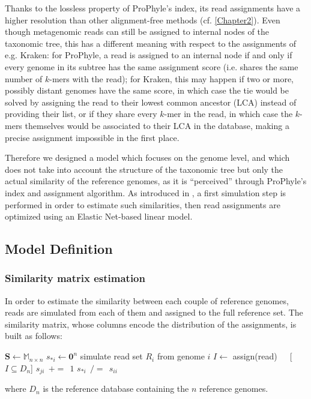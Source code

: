 Thanks to the lossless property of ProPhyle's index, its read assignments have a higher resolution than other alignment-free methods (cf. \ref{Chapter2}). Even though metagenomic reads can still be assigned to internal nodes of the taxonomic tree, this has a different meaning with respect to the assignments of e.g. Kraken: for ProPhyle, a read is assigned to an internal node if and only if every genome in its subtree has the same assignment score (i.e. shares the same number of $k$-mers with the read); for Kraken, this may happen if two or more, possibly distant genomes have the same score, in which case the tie would be solved by assigning the read to their lowest common ancestor (LCA) instead of providing their list, or if they share every $k$-mer in the read, in which case the $k$-mers themselves would be associated to their LCA in the database, making a precise assignment impossible in the first place.

Therefore we designed a model which focuses on the genome level, and which does not take into account the structure of the taxonomic tree but only the actual similarity of the reference genomes, as it is ``perceived'' through ProPhyle's index and assignment algorithm. As introduced in \cite{lindner_metagenomic_2013}, a first simulation step is performed in order to estimate such similarities, then read assignments are optimized using an Elastic Net-based linear model.

\subsection{Model Definition}

\subsubsection{Similarity matrix estimation}
In order to estimate the similarity between each couple of reference genomes, reads are simulated from each of them and assigned to the full reference set. The similarity matrix, whose columns encode the distribution of the assignments, is built as follows:
\newpage
\begin{algorithmic}
\State $\mathbf{S} \gets \mathbb{M}_{n\times n}$
\State $s_{*i} \gets \mathbf{0}^n$
\State simulate read set $R_i$ from genome $i$
\State $I \gets$ assign(read)~~~[$I \subseteq D_n$]
\State $s_{ji}~~{+=}~~1$
\EndFor
\EndFor
$s_{*i}~~{/=}~~s_{ii}$
\EndFor
\end{algorithmic}
where $D_n$ is the reference database containing the $n$ reference genomes.

